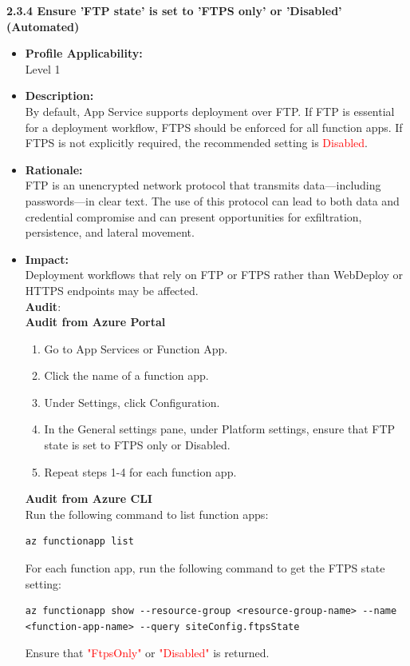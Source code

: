 \documentclass[a4paper,11pt]{report}
\begin{document}
\begin{tcolorbox}[
    colback=gray!8,
    colframe=gray!40,
    boxrule=0.5pt,
    arc=0pt,
    breakable,
    left=8pt, right=8pt, top=6pt, bottom=6pt
]
\textbf{2.3.4 Ensure 'FTP state' is set to 'FTPS only' or 'Disabled' (Automated)}

\begin{itemize}
    \item \textbf{Profile Applicability:}\\ Level 1
    \item \textbf{Description:}\\ By default, App Service supports deployment over FTP. If FTP is essential for a deployment workflow, FTPS should be enforced for all function apps.
If FTPS is not explicitly required, the recommended setting is \textcolor{red}{Disabled}.
    \item \textbf{Rationale:}\\ FTP is an unencrypted network protocol that transmits data—including passwords—in clear text. The use of this protocol can lead to both data and credential compromise and can present opportunities for exfiltration, persistence, and lateral movement.
    \item \textbf{Impact:} \\
    Deployment workflows that rely on FTP or FTPS rather than WebDeploy or HTTPS endpoints may be affected.\\
	\textbf{Audit}:\\
    \textbf{Audit from Azure Portal}
    \begin{enumerate}
    \item Go to App Services or Function App.
    \item Click the name of a function app.
    \item Under Settings, click Configuration.
    \item In the General settings pane, under Platform settings, ensure that FTP state is set to FTPS only or Disabled.
    \item Repeat steps 1-4 for each function app.
    \end{enumerate}
	\textbf{Audit from Azure CLI} \\
	Run the following command to list function apps: \\
	
	\begin{lstlisting}[style=azcli]
	az functionapp list
	\end{lstlisting}


For each function app, run the following command to get the FTPS state setting:
	\begin{lstlisting}[style=azcli]
	az functionapp show --resource-group <resource-group-name> --name <function-app-name> --query siteConfig.ftpsState
	\end{lstlisting}
Ensure that \textcolor{red}{"FtpsOnly"} or \textcolor{red}{"Disabled"} is returned.
\end{itemize}
\end{tcolorbox}
\end{document}
